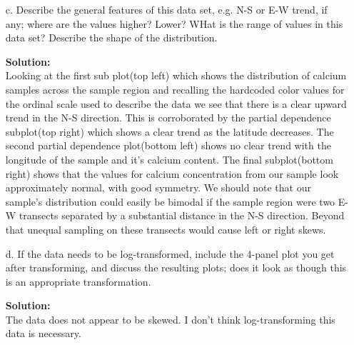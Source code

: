 \documentclass[12pt]{article}
\makeatletter
\theoremstyle{homework}
\newenvironment{exercise}[1]
{\def\@currentlabel{#1}\exercisecore}
{\endexercisecore}
\newcommand{\localhead}[1]{\par\smallskip\noindent\textbf{#1}\nobreak\\}%
\newcommand\solution{\localhead{Solution:}}
\makeatother
\begin{document}
\begin{exercise}{2}
\begin{enumerate}
        \item[c.] Describe the general features of this data set, e.g. N-S or E-W trend, if any; where are the values higher? Lower? WHat is the range of values in this 
        data set? Describe the shape of the distribution.\\
        \solution Looking at the first sub plot(top left) which shows the distribution of calcium samples across the sample region and recalling the hardcoded color values for the ordinal scale used to describe the data
        we see that there is a clear upward trend in the N-S direction. This is corroborated by the partial dependence subplot(top right) which shows a clear trend as the latitude decreases. The second partial dependence plot(bottom left)
        shows no clear trend with the longitude of the sample and it's calcium content. The final subplot(bottom right) shows that the values for calcium concentration from our sample look approximately normal, with good symmetry. We should note that our sample's distribution could 
        easily be bimodal if the sample region were two E-W transects separated by a substantial distance in the N-S direction. Beyond that unequal sampling on these transects would cause left or right skews. 
        \vspace{.15in}


        \item[d.] If the data needs to be log-transformed, include the 4-panel plot you get after transforming, and discuss the resulting plots; does it look as though this is an appropriate transformation.\\
        \solution The data does not appear to be skewed. I don't think log-transforming this data is necessary. 
        \vspace{.15in}


\end{enumerate}
\end{exercise}
\end{document}
